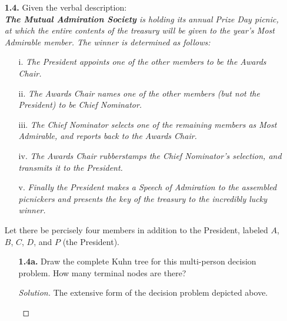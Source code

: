 \documentclass[ 12pt ]{article}
\begin{document}
\begin{enumerate}
\begin{enumerate}
			\item[\textbf{1.4.}]
				Given the verbal description: \\
				\textit{\textbf{The Mutual Admiration Society} is holding its annual Prize Day picnic, at which the entire contents of the treasury will be given to the year's Most
					Admirable member. The winner is determined as follows:}
						\begin{enumerate}
							\item[i.] \textit{The President appoints one of the other members to be the Awards Chair.}
							\item[ii.] \textit{The Awards Chair names one of the other members (but not the President) to be Chief Nominator.}
							\item[iii.] \textit{The Chief Nominator selects one of the remaining members as Most Admirable, and reports back to the Awards Chair.}
							\item[iv.] \textit{The Awards Chair rubberstamps the Chief Nominator's selection, and transmits it to the President.}
							\item[v.] \textit{Finally the President makes a Speech of Admiration to the assembled picnickers and presents the key of the treasury to the incredibly lucky
								winner.}
						\end{enumerate}
						Let there be percisely four members in addition to the President, labeled $A$, $B$, $C$, $D$, and $P$ (the President).
						\newpage
				\begin{enumerate}
					\item[\textbf{1.4a.}] Draw the complete Kuhn tree for this multi-person decision problem. How many terminal nodes are there?
						\begin{proof}[Solution]
							The extensive form of the decision problem depicted above.
							\begin{center}

\end{center}
\end{proof}
\end{enumerate}
\end{enumerate}
\end{enumerate}
\end{document}
